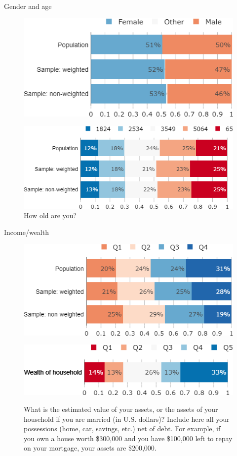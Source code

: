 \documentclass[aspectratio=169,9pt,dvipsnames]{beamer}
\begin{document}
\begin{frame}{Gender and age}%
\begin{figure}[h!]
\centering
\caption{What is your gender?}
\includegraphics[width=.5\textwidth]{../figures/US/gender_US_comp.png} \\
\centering
\caption{How old are you?}
\includegraphics[width=.5\textwidth]{../figures/US/age_US_comp.png}
\end{figure}
\end{frame}

\begin{frame}{Income/wealth}%
\begin{figure}[h!]
\centering
\captionsetup{justification=centering}
\caption{What was the annual income of your household in 2019 (before withholding tax, for you and those who live with you)?}
\includegraphics[width=.5\textwidth]{../figures/US/income_US_comp.png} \\
\vspace{.5cm}
\caption{\small What is the estimated value of your assets, or the assets of your household if you are married (in U.S. dollars)? Include here all your possessions (home, car, savings, etc.) net of debt. For example, if you own a house worth \$300,000 and you have \$100,000 left to repay on your mortgage, your assets are \$200,000.}
\includegraphics[width=.5\textwidth]{../figures/US/wealth_US.png} \\
\end{figure}
\end{frame}
\end{document}
